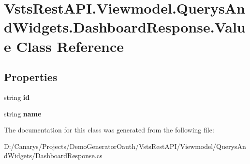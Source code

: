 \hypertarget{class_vsts_rest_a_p_i_1_1_viewmodel_1_1_querys_and_widgets_1_1_dashboard_response_1_1_value}{}\section{Vsts\+Rest\+A\+P\+I.\+Viewmodel.\+Querys\+And\+Widgets.\+Dashboard\+Response.\+Value Class Reference}
\label{class_vsts_rest_a_p_i_1_1_viewmodel_1_1_querys_and_widgets_1_1_dashboard_response_1_1_value}
\subsection*{Properties}
\begin{DoxyCompactItemize}
\item 
\mbox{\label{class_vsts_rest_a_p_i_1_1_viewmodel_1_1_querys_and_widgets_1_1_dashboard_response_1_1_value_ad336af95505e3ec4d0f21354dca93f50}} 
string {\bfseries id}
\item 
\mbox{\label{class_vsts_rest_a_p_i_1_1_viewmodel_1_1_querys_and_widgets_1_1_dashboard_response_1_1_value_a9e47849119251c5a5744481c978080c6}} 
string {\bfseries name}
\end{DoxyCompactItemize}


The documentation for this class was generated from the following file\+:\begin{DoxyCompactItemize}
\item 
D\+:/\+Canarys/\+Projects/\+Demo\+Generator\+Oauth/\+Vsts\+Rest\+A\+P\+I/\+Viewmodel/\+Querys\+And\+Widgets/Dashboard\+Response.\+cs\end{DoxyCompactItemize}
